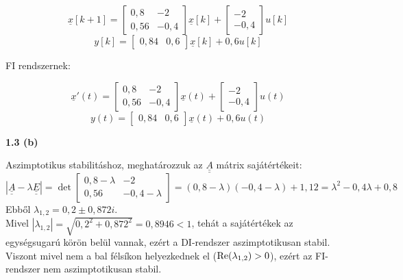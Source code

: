 \documentclass[12pt,a4paper]{article}
\newcommand\uuline[1]{\underline{\underline{#1}}}
\newcommand\uline[1]{\underline{#1}}
\begin{document}
\[\uline{x}[k+1] = \left[\begin{matrix}0,8 & -2\\0,56 & -0,4\end{matrix}\right]\uline{x}[k] + \left[\begin{matrix}-2\\-0,4\end{matrix}\right]u[k]\]
\[y[k] = \left[\begin{matrix}0,84 & 0,6\end{matrix}\right]\uline{x}[k] + 0,6u[k]\]

FI rendszernek:

\[\uline{x}'(t) = \left[\begin{matrix}0,8 & -2\\0,56 & -0,4\end{matrix}\right]\uline{x}(t) + \left[\begin{matrix}-2\\-0,4\end{matrix}\right]u(t)\]
\[y(t) = \left[\begin{matrix}0,84 & 0,6\end{matrix}\right]\uline{x}(t) + 0,6u(t)\]

\textbf{1.3 (b)}

Aszimptotikus stabilitáshoz, meghatározzuk az $\uuline{A}$ mátrix sajátértékeit:
\[|\uuline{A}-\lambda\uuline{E}| = \det\left[\begin{matrix}0,8-\lambda & -2\\0,56 & -0,4-\lambda\end{matrix}\right] = (0,8-\lambda)(-0,4-\lambda)+1,12=\lambda^2-0,4\lambda+0,8\]
Ebből $\lambda_{1,2} = 0,2 \pm 0,872i$.\\

Mivel $|\lambda_{1,2}| = \sqrt{0,2^2+0,872^2}=0,8946 < 1$, tehát a sajátértékek az egységsugarú körön belül vannak, ezért a DI-rendszer aszimptotikusan stabil. Viszont mivel nem a bal félsíkon helyezkednek el ($\hbox{Re}(\lambda_{1,2})>0$), ezért az FI-rendszer nem aszimptotikusan stabil.
\end{document}
